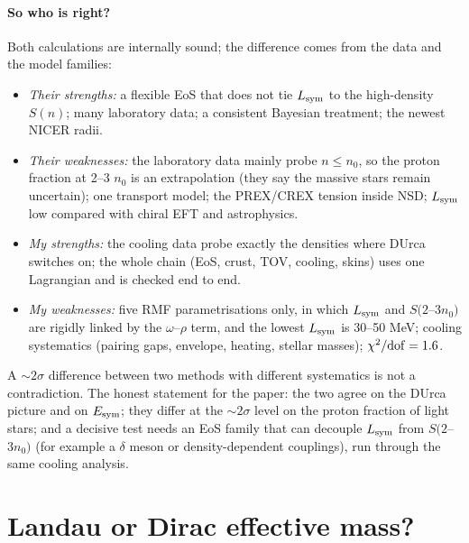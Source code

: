 \documentclass[11pt,a4paper]{article}
\newcommand{\Esym}{E_{\rm sym}}
\newcommand{\Lsym}{L_{\rm sym}}
\begin{document}
\paragraph{So who is right?} Both calculations are internally sound; the difference comes from the data and the model families:
\begin{itemize}
\item \emph{Their strengths:} a flexible EoS that does not tie $\Lsym$ to the high-density $S(n)$; many laboratory data; a consistent Bayesian treatment; the newest NICER radii.
\item \emph{Their weaknesses:} the laboratory data mainly probe $n\le n_0$, so the proton fraction at 2--3 $n_0$ is an extrapolation (they say the massive stars remain uncertain); one transport model; the PREX/CREX tension inside NSD; $\Lsym$ low compared with chiral EFT and astrophysics.
\item \emph{My strengths:} the cooling data probe exactly the densities where DUrca switches on; the whole chain (EoS, crust, TOV, cooling, skins) uses one Lagrangian and is checked end to end.
\item \emph{My weaknesses:} five RMF parametrisations only, in which $\Lsym$ and $S(2$--$3n_0)$ are rigidly linked by the $\omega$--$\rho$ term, and the lowest $\Lsym$ is 30--50 MeV; cooling systematics (pairing gaps, envelope, heating, stellar masses); $\chi^2/{\rm dof}=1.6$.
\end{itemize}
A $\sim2\sigma$ difference between two methods with different systematics is not a contradiction. The honest statement for the paper: the two agree on the DUrca picture and on $\Esym$; they differ at the $\sim2\sigma$ level on the proton fraction of light stars; and a decisive test needs an EoS family that can decouple $\Lsym$ from $S(2$--$3n_0)$ (for example a $\delta$ meson or density-dependent couplings), run through the same cooling analysis.

\section{Landau or Dirac effective mass?}
\end{document}
